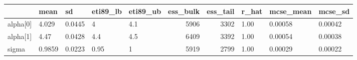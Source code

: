 \begin{tabular}{lllllrrlll}
\toprule
 & mean & sd & eti89_lb & eti89_ub & ess_bulk & ess_tail & r_hat & mcse_mean & mcse_sd \\
\midrule
alpha[0] & 4.029 & 0.0445 & 4 & 4.1 & 5906 & 3302 & 1.00 & 0.00058 & 0.00042 \\
alpha[1] & 4.47 & 0.0428 & 4.4 & 4.5 & 6409 & 3392 & 1.00 & 0.00054 & 0.00038 \\
sigma & 0.9859 & 0.0223 & 0.95 & 1 & 5919 & 2799 & 1.00 & 0.00029 & 0.00022 \\
\bottomrule
\end{tabular}

